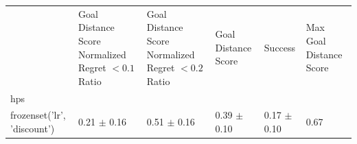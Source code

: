 \begin{tabular}{llllll}
\toprule
 & Goal Distance Score Normalized Regret $< 0.1$ Ratio & Goal Distance Score Normalized Regret $< 0.2$ Ratio & Goal Distance Score & Success & Max Goal Distance Score \\
hps &  &  &  &  &  \\
\midrule
frozenset({'lr', 'discount'}) & 0.21 $\pm$ 0.16 & 0.51 $\pm$ 0.16 & 0.39 $\pm$ 0.10 & 0.17 $\pm$ 0.10 & 0.67 \\
\bottomrule
\end{tabular}
